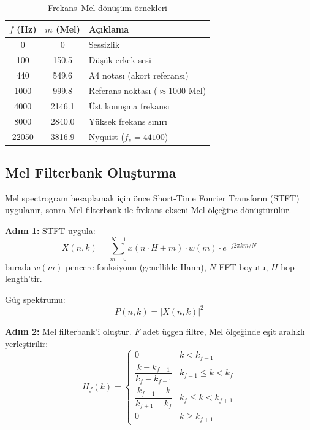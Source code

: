 \begin{table}[H]
\centering
\caption{Frekans--Mel d\"{o}n\"{u}\c{s}\"{u}m \"{o}rnekleri}
\label{tab:mel_examples}
\begin{tabular}{ccl}
\toprule
\color{chapterBlue}\textbf{$f$ (Hz)} & \color{chapterBlue}\textbf{$m$ (Mel)} & \color{chapterBlue}\textbf{A\c{c}{\i}klama} \\
\midrule
0      & 0       & Sessizlik \\
100    & 150.5   & D\"{u}\c{s}\"{u}k erkek sesi \\
440    & 549.6   & A4 notas{\i} (akort referans{\i}) \\
1000   & 999.8   & Referans noktas{\i} ($\approx 1000$ Mel) \\
4000   & 2146.1  & \"{U}st konu\c{s}ma frekans{\i} \\
8000   & 2840.0  & Y\"{u}ksek frekans s{\i}n{\i}r{\i} \\
22050  & 3816.9  & Nyquist ($f_s = 44100$) \\
\bottomrule
\end{tabular}
\end{table}

\subsection{Mel Filterbank Olu\c{s}turma}

Mel spectrogram hesaplamak i\c{c}in \"{o}nce Short-Time Fourier Transform (STFT) uygulan{\i}r, sonra Mel filterbank ile frekans ekseni Mel \"{o}l\c{c}e\u{g}ine d\"{o}n\"{u}\c{s}t\"{u}r\"{u}l\"{u}r.

\textbf{Ad{\i}m 1:} STFT uygula:
\begin{equation}
\label{eq:stft}
X(n, k) = \sum_{m=0}^{N-1} x(n \cdot H + m) \cdot w(m) \cdot e^{-j2\pi km/N}
\end{equation}
burada $w(m)$ pencere fonksiyonu (genellikle Hann), $N$ FFT boyutu, $H$ hop length'tir.

G\"{u}\c{c} spektrumu:
\begin{equation}
\label{eq:power_spectrum}
P(n, k) = |X(n, k)|^2
\end{equation}

\textbf{Ad{\i}m 2:} Mel filterbank'i olu\c{s}tur. $F$ adet \"{u}\c{c}gen filtre, Mel \"{o}l\c{c}e\u{g}inde e\c{s}it aral{\i}kl{\i} yerle\c{s}tirilir:
\begin{equation}
\label{eq:mel_filter}
H_f(k) = \begin{cases}
0 & k < k_{f-1} \\[4pt]
\dfrac{k - k_{f-1}}{k_f - k_{f-1}} & k_{f-1} \leq k < k_f \\[6pt]
\dfrac{k_{f+1} - k}{k_{f+1} - k_f} & k_f \leq k < k_{f+1} \\[4pt]
0 & k \geq k_{f+1}
\end{cases}
\end{equation}

